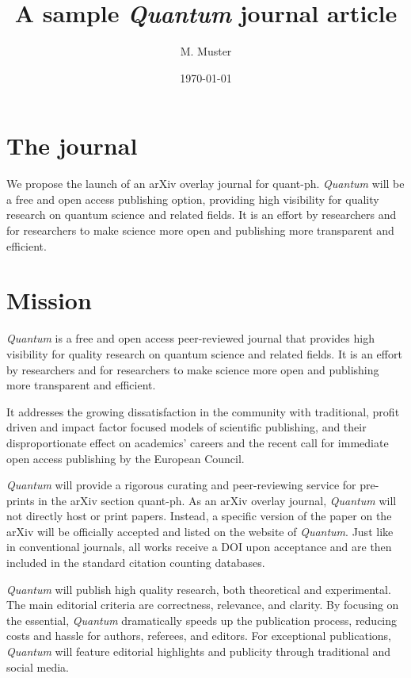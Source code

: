 \documentclass[12pt]{quantumarticle}
\begin{document}
\title{A sample \textit{Quantum} journal article}
\author{M. Muster}
\date{\today}
\maketitle
{}

\section{The  journal}
We propose the launch of an arXiv overlay journal for quant-ph. \textit{Quantum} will be a free and open access publishing option, providing high visibility for quality research on quantum science and related fields. It is an effort by researchers and for researchers to make science more open and publishing more transparent and efficient.

\section{Mission}
\textit{Quantum} is a free and open access peer-reviewed journal that provides high visibility for quality research on quantum science and related fields. It is an effort by researchers and for researchers to make science more open and publishing more transparent and efficient.

It addresses the growing dissatisfaction in the community with traditional, profit driven and impact factor focused models of scientific publishing, and their disproportionate effect on academics’ careers and the recent call for immediate open access publishing by the European Council.

\textit{Quantum} will provide a rigorous curating and peer-reviewing service for pre-prints in the arXiv section quant-ph. As an arXiv overlay journal, \textit{Quantum} will not directly host or print papers. Instead, a specific version of the paper on the arXiv will be officially accepted and listed on the website of \textit{Quantum}. Just like in conventional journals, all works receive a DOI upon acceptance and are then included in the standard citation counting databases.

\textit{Quantum} will publish high quality research, both theoretical and experimental. The main editorial criteria are correctness, relevance, and clarity. By focusing on the essential, \textit{Quantum} dramatically speeds up the publication process, reducing costs and hassle for authors, referees, and editors. For exceptional publications, \textit{Quantum} will feature editorial highlights and publicity through traditional and social media.
\end{document}
